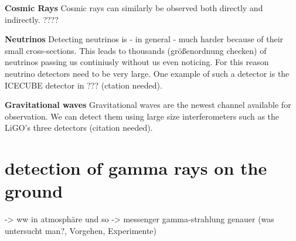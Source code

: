 \textbf{Cosmic Rays}
Cosmic rays can similarly be observed both directly and indirectly.
????

\textbf{Neutrinos}
Detecting neutrinos is - in general - much harder because of
their small cross-sections. This leads to thousands (größenordnung checken) of
neutrinos passing us continiusly without us even noticing.
For this reason neutrino detectors need to be very large. One example
of such a detector is the ICECUBE detector in ??? (ctation needed).

\textbf{Gravitational waves}
Gravitational waves are the newest channel available for observation.
We can detect them using large size interferometers such as
the LiGO's three detectors (citation needed).





\section{detection of gamma rays on the ground}
-> ww in atmosphäre und so
-> messenger gamma-strahlung genauer (was untersucht man?, Vorgehen, Experimente)

